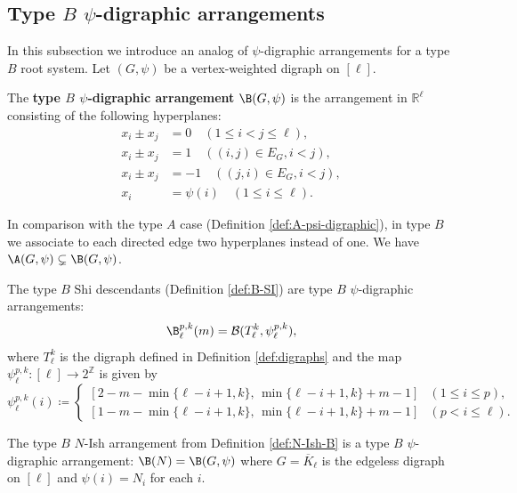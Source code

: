 \subsection{Type \texorpdfstring{$B$}{B} \texorpdfstring{$\psi$}{psi}-digraphic arrangements}
\label{subsec:BDA}
In this subsection we introduce an analog of $ \psi $-digraphic arrangements for a type $B$ root system. 
Let $(G,\psi)$ be a vertex-weighted digraph on $ [\ell] $. 
\begin{definition}
The  \textbf{type $B$  $ \psi $-digraphic arrangement} $ \B(G,\psi) $ is the arrangement  in $ \mathbb{R}^{\ell} $
consisting of the following hyperplanes:
\begin{align*}
x_{i}\pm x_{j} &= 0\quad  (1 \leq i < j \leq \ell), \\
x_{i}\pm x_{j} &= 1\quad  ((i,j) \in E_{G}, i<j), \\
x_{i}\pm x_{j} &= -1\quad  ((j,i) \in E_{G}, i<j), \\
x_i&=  \psi(i)\quad (1 \le  i \leq \ell).
\end{align*}
\end{definition}

In comparison with the type $A$ case (Definition \ref{def:A-psi-digraphic}), in type $B$ we associate to each directed edge two hyperplanes instead of one. We have $\A(G,\psi) \subsetneq \B(G,\psi)$.



\begin{example}
\label{ex:BSI-pda}
The type $B$ Shi descendants (Definition \ref{def:B-SI}) are type $B$ $ \psi $-digraphic arrangements:
 $$\B^{p,k}_\ell(m)= \mathcal{B}(T_{\ell}^{k}, \psi_{\ell}^{p,k}),$$
where $ T_{\ell}^{k}$ is the digraph defined in Definition \ref{def:digraphs} and the map $ \psi_{\ell}^{p,k} \colon [\ell] \to 2^{\mathbb{Z}} $ is given by 
$$
 \psi_{\ell}^{p,k}(i)   \coloneqq \begin{cases}
 [2-m-\min\{\ell-i+1, k\},\,\min\{\ell-i+1, k\}+m-1] & (1 \leq   i \leq p), \\
 [1-m-\min\{\ell-i+1, k\},\,\min\{\ell-i+1, k\}+m-1] & (p<  i \leq \ell). 
\end{cases}
$$
\end{example}


\begin{example}
\label{ex:BN-Ish}
The type $B$ $N$-Ish arrangement from Definition \ref{def:N-Ish-B} is a type $B$ $ \psi $-digraphic arrangement:
$\B(N) = \B(G,\psi)$ where $G =  \overline{K}_{\ell}$ is the edgeless digraph on $ [\ell]$ and $\psi(i) =N_i$ for each $i$.
\end{example}

